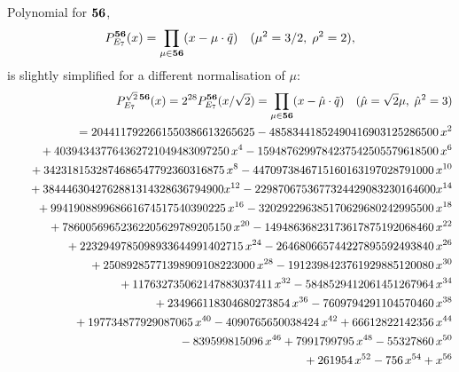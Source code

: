 \documentclass[a4paper,12pt]{article}
\begin{document}
Polynomial for ${\bf 56}$,
\begin{equation}
   P_{E_7}^{\bf 56}(x)=
   \prod_{\mu\in{\bf 56}}(x-\mu\cdot\tilde{q})\quad(\mu^2=3/2,\;\rho^2=2),
   \label{e7r56o}
\end{equation}
is slightly simplified for a different normalisation of $\mu$:
\begin{eqnarray}
   &&P_{E_7}^{\sqrt{2}\,{\bf 56}}(x)=2^{28}P_{E_7}^{\bf 56}(x/\sqrt{2})=
   \prod_{\mu\in{\bf 56}}(x-\hat{\mu}\cdot\tilde{q})\quad
   (\hat{\mu}=\sqrt{2}\mu,\;\hat{\mu}^2=3)\nonumber\\
%
   &&=2044117922661550386613265625 -
    48583441852490416903125286500\,x^2\nonumber\\
   &&\phantom{=} +
    403943437764362721049483097250\,x^4 -
    1594876299784237542505579618500\,x^6\nonumber\\
   &&\phantom{=} +
    3423181532874686547792360316875\,x^8 -
    4470973846715160163197028791000\,x^{10}\nonumber\\
   &&\phantom{=} +
    3844463042762881314328636794900x^{12} -
    2298706753677324429083230164600x^{14}\nonumber\\
   &&\phantom{=} +
    994190889968661674517540390225\,x^{16} -
    320292296385170629680242995500\,x^{18}\nonumber\\
   &&\phantom{=} +
    78600569652362205629789205150\,x^{20} -
    14948636823173617875192068460\,x^{22}\nonumber\\
   &&\phantom{=} +
    2232949785098933644991402715\,x^{24} -
    264680665744227895592493840\,x^{26}\nonumber\\
   &&\phantom{=} +
    25089285771398909108223000\,x^{28} -
    1912398423761929885120080\,x^{30}\nonumber\\
   &&\phantom{=} +
    117632735062147883037411\,x^{32} -
    5848529412061451267964\,x^{34}\nonumber\\
   &&\phantom{=} +
    234966118304680273854\,x^{36} -
    7609794291104570460\,x^{38}\nonumber\\
   &&\phantom{=} +
    197734877929087065\,x^{40} -
    4090765650038424\,x^{42} + 66612822142356\,x^{44}\nonumber\\
   &&\phantom{=} -
    839599815096\,x^{46} + 7991799795\,x^{48} -
    55327860\,x^{50}\nonumber\\
   &&\phantom{=} + 261954\,x^{52} - 756\,x^{54} + x^{56}
   \label{e7rat56}
\end{eqnarray}

\end{document}
